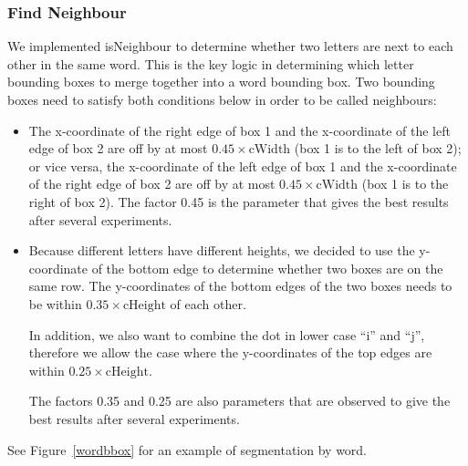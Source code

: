 \documentclass[conference]{IEEEtran}
\begin{document}
\subsubsection{Find Neighbour}
We implemented isNeighbour to determine whether two letters are next to each other in the same word.  This is the key logic in determining which letter bounding boxes to merge together into a word bounding box.  Two bounding boxes need to satisfy both conditions below in order to be called neighbours:
\begin{itemize}
\item The x-coordinate of the right edge of box 1 and the x-coordinate of the left edge of box 2 are off by at most $0.45 \times \mbox{cWidth}$ (box 1 is to the left of box 2); or vice versa, the x-coordinate of the left edge of box 1 and the x-coordinate of the right edge of box 2 are off by at most $0.45 \times \mbox{cWidth}$ (box 1 is to the right of box 2).  The factor 0.45 is the parameter that gives the best results after several experiments.
\item  Because different letters have different heights, we decided to use the y-coordinate of the bottom edge to determine whether two boxes are on the same row.  The y-coordinates of the bottom edges of the two boxes needs to be within $0.35 \times \mbox{cHeight}$ of each other.

In addition, we also want to combine the dot in lower case ``i'' and ``j'', therefore we allow the case where the y-coordinates of the top edges are within $0.25 \times \mbox{cHeight}$.

The factors 0.35 and 0.25 are also parameters that are observed to give the best results after several experiments.
\end{itemize}

See Figure~\ref{wordbbox} for an example of segmentation by word.
\end{document}
